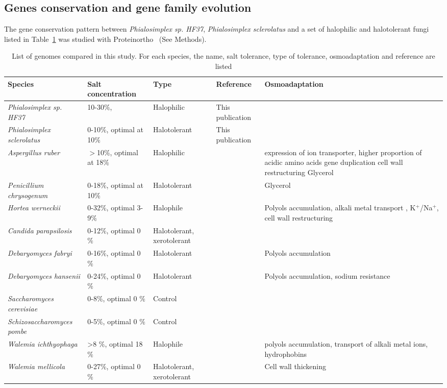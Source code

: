 \documentclass[fontsize=10pt, paper=a4,fleqn, ]{wlscirep}
\newcommand{\TODO}[1]{\textbf{\color{red}{#1}}}
\newcommand{\horWer}{\textit{Hortea werneckii}}
\newcommand{\aspRub}{\textit{Aspergillus ruber}}
\newcommand{\penChr}{\textit{Penicillium chrysogenum}}
\newcommand{\debFab}{\textit{Debaryomyces fabryi}}
\newcommand{\debHan}{\textit{Debaryomyces hansenii}}
\newcommand{\walIch}{\textit{Walemia ichthyophaga}}
\newcommand{\walMel}{\textit{Walemia mellicola}}
\newcommand{\canPar}{\textit{Candida parapsilosis}}
\newcommand{\sacCer}{\textit{Saccharomyces cerevisiae}}
\newcommand{\schPom}{\textit{Schizosaccharomyces pombe}}
\newcommand{\phiSp}{\textit{Phialosimplex sp. HF37}}
\newcommand{\phiScl}{\textit{Phialosimplex sclerolatus}}
\begin{document}
\subsection{Genes conservation and gene family evolution}
The gene conservation pattern between {\phiSp}, {\phiScl} and a set of
halophilic and halotolerant fungi listed in Table~\ref{tab:species}
was studied with Proteinortho~\cite{Lechner2011} (See Methods). 
\begin{table}
  \begin{center}
    \small
    \begin{tabular}{|l|l|p{2cm}|l|p{5cm}|}
      \hline
      Species   & Salt concentration & Type & Reference & Osmoadaptation \\
      \hline
      {\phiSp}  & 10-30$\%$,\TODO{optimal at 15$\%$} & Halophilic &
      This publication &\\ 
      {\phiScl} & 0-10$\%$, optimal at 10$\%$ & Halotolerant & This publication &\\
      {\aspRub} & $>$10$\%$,  optimal at 18$\%$&  Halophilic
      &\cite{Kis2014}&       expression of ion transporter, higher
      proportion of acidic amino acids gene duplication cell wall restructuring
      Glycerol\\
      {\penChr} & 0-18$\%$, optimal at 10$\%$ & Halotolerant
      &\cite{Attaby2001}& Glycerol \\
      {\horWer} & 0-32$\%$, optimal 3-9$\%$ & Halophile   &
      \cite{Plemenitas2015}& Polyols accumulation, alkali metal
      transport , K$^+$/Na$^+$, cell wall restructuring\\
      {\canPar} & 0-12$\%$, optimal 0 $\%$ & Halotolerant, xerotolerant & \cite{Krauke2010}&\\
      {\debFab} & 0-16$\%$, optimal 0 $\%$ & Halotolerant &
      \cite{Michan2013}& Polyols accumulation\\
      {\debHan} & 0-24$\%$, optimal 0 $\%$ & Halotolerant & \cite{Michan2013}& Polyols accumulation, sodium resistance\\
      {\sacCer} & 0-8$\%$, optimal 0 $\%$ & Control & \cite{Lages1999}&\\
      {\schPom} & 0-5$\%$, optimal 0 $\%$ & Control & \cite{Lages1999}&\\
      {\walIch} & >8 $\%$, optimal 18 $\%$ & Halophile &
      ~\cite{Zajc2013} & polyols accumulation, transport of alkali metal
      ions, hydrophobins\\
      {\walMel} & 0-27$\%$, optimal 0 $\%$ & Halotolerant,
      xerotolerant & ~\cite{Kuncic2010} & Cell wall thickening\\
      \hline
    \end{tabular}
    \caption{\label{tab:species} List of genomes compared in this
      study. For each species, the name, salt tolerance, type of
      tolerance, osmoadaptation and reference are listed}
    
  \end{center}
\end{table}
\end{document}
